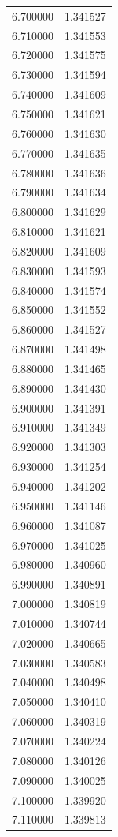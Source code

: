\begin{tabular}{rr}
6.700000 & 1.341527 \\
6.710000 & 1.341553 \\
6.720000 & 1.341575 \\
6.730000 & 1.341594 \\
6.740000 & 1.341609 \\
6.750000 & 1.341621 \\
6.760000 & 1.341630 \\
6.770000 & 1.341635 \\
6.780000 & 1.341636 \\
6.790000 & 1.341634 \\
6.800000 & 1.341629 \\
6.810000 & 1.341621 \\
6.820000 & 1.341609 \\
6.830000 & 1.341593 \\
6.840000 & 1.341574 \\
6.850000 & 1.341552 \\
6.860000 & 1.341527 \\
6.870000 & 1.341498 \\
6.880000 & 1.341465 \\
6.890000 & 1.341430 \\
6.900000 & 1.341391 \\
6.910000 & 1.341349 \\
6.920000 & 1.341303 \\
6.930000 & 1.341254 \\
6.940000 & 1.341202 \\
6.950000 & 1.341146 \\
6.960000 & 1.341087 \\
6.970000 & 1.341025 \\
6.980000 & 1.340960 \\
6.990000 & 1.340891 \\
7.000000 & 1.340819 \\
7.010000 & 1.340744 \\
7.020000 & 1.340665 \\
7.030000 & 1.340583 \\
7.040000 & 1.340498 \\
7.050000 & 1.340410 \\
7.060000 & 1.340319 \\
7.070000 & 1.340224 \\
7.080000 & 1.340126 \\
7.090000 & 1.340025 \\
7.100000 & 1.339920 \\
7.110000 & 1.339813 \\

\end{tabular}
